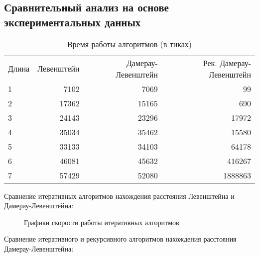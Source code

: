\documentclass[a4paper, 14pt]{article}
\begin{document}
	\subsection{Сравнительный анализ на основе экспериментальных данных}
	
\begin{table}[H]
\begin{center}
\caption{Время работы алгоритмов (в тиках)}
	\begin{tabular} {l r r r}
	Длина  & Левенштейн & Дамерау-Левенштейн & Рек. Дамерау-Левенштейн\\
	1 & 7102 & 7069 & 99\\
	2 & 17362 & 15165 & 690\\
	3 & 24143 & 23296 & 17972\\
	4 & 35034 & 35462 & 15580\\
	5 & 33133 & 34103 & 64178\\
	6 & 46081 & 45632 & 416267\\
	7 & 57429 & 52080 & 1888863\\
	\end{tabular} 
	\end{center}
	\end{table}
	
	Сравнение итеративных алгоритмов нахождения расстояния Левенштейна и Дамерау-Левенштейна:
	
	\begin{figure}[H]
	\caption{Графики скорости работы итеративных алгоритмов}
	\end{figure}
	
	Сравнение итеративного и рекурсивного алгоритмов нахождения расстояния Дамерау-Левенштейна:
	
\end{document}
